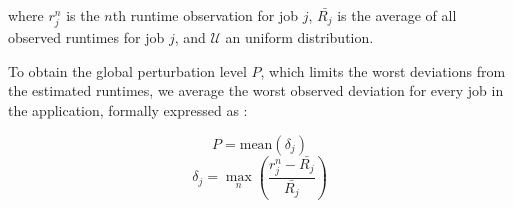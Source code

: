 \documentclass[10pt,conference,compsocconf]{IEEEtran}
\begin{document}
where $r_j^n$ is the $n$th runtime observation for job $j$, $\bar{R_j}$ is the
average of all observed runtimes for job $j$, and $\mathcal{U}$ an uniform distribution.

To obtain the  global perturbation level $P$, which limits  the worst deviations
from the estimated  runtimes, we average the worst observed  deviation for every
job in the application, formally expressed as :

\begin{equation}
P = \textrm{mean}(\delta{}_j)
\label{eq:P}
\end{equation}
\begin{equation}
\delta{}_j =
\max_n\left(\frac{r_j^n-\bar{R_j}}{\bar{R_j}}\right)
\label{eq:d}
\end{equation}

\end{document}
